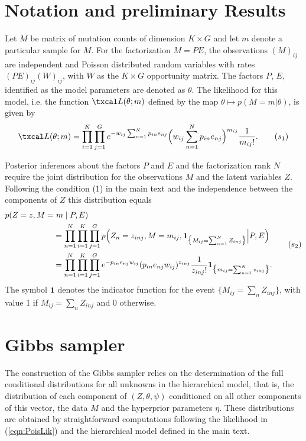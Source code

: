 \documentclass[11pt]{amsart}
\theoremstyle{definition}
\theoremstyle{remark}
\begin{document}
\tableofcontents 

\section{Notation and preliminary Results}
Let $M$ be matrix of mutation counts of dimension $K\times G$ and let
$m$ denote a particular sample for $M$. For the factorization $M=PE$,
the observations $(M)_{ij}$ are independent and Poisson distributed
random variables with rates $(PE)_{ij}(W)_{ij}$, with $W$ as the
$K\times G$ opportunity matrix. The factors $P$, $E$, identified as
the model parameters are denoted as $\theta$. The likelihood for this
model, i.e. the function $\txcal L(\theta; m)$ defined by the map
$\theta \mapsto p(M=m|\theta)$, is given by
\begin{equation}
  \label{eqn:PoisLik}
   \txcal L(\theta; m) 
   =
    \prod_{i=1}^K \prod_{j=1}^G e^{-w_{ij}\sum_{n=1}^{N}p_{in}e_{nj}}
    \Big(w_{ij}\sum_{n=1}^{N}p_{in}e_{nj}\Big)^{m_{ij}}
    \frac{1}{m_{ij}!}.\tag{$s_1$}
\end{equation}

Posterior inferences about the factors $P$ and $E$ and the
factorization rank $N$ require the joint distribution for the
observations $M$ and the latent variables $Z$. Following the condition (1) in the main text and the independence between
the components of $Z$ this distribution equals
\begin{equation}
   \label{eqn:jointdata}
 \begin{aligned}
    p(Z = z, M =&\ m \mid P, E) \notag\\
  &= 
    \prod_{n=1}^N\prod_{i=1}^K\prod_{j=1}^G p\Big(Z_n = z_{inj}, M =
    m_{ij}, \mathbf{1}_{\big\{M_{ij} = \sum_{n=1}^N
      Z_{inj}\big\}} \Big| P, E\Big)  \notag\\ 
  &=
    \prod_{n=1}^N\prod_{i=1}^K\prod_{j=1}^G e^{-p_{in}e_{nj}w_{ij}}
    (p_{in}e_{nj}w_{ij})^{z_{inj}} \frac{1}{z_{inj}!}
    \mathbf{1}_{\big\{m_{ij} = \sum_{n=1}^N z_{inj}\big\}}.
 \end{aligned}
 \tag{$s_2$}
\end{equation}
The symbol $\mathbf{1}$ denotes the indicator function for the 
event $\big\{M_{ij} = \sum_n Z_{inj}\big\}$, with value 1 if $M_{ij} =  
\sum_n  Z_{inj}$ and 0 otherwise.


\section{Gibbs sampler}
\label{sec:Gibbs}
The construction of the Gibbs sampler relies on the determination of
the full conditional distributions for all unknowns in the
hierarchical model, that is, the distribution of each component of
$(Z, \theta, \psi)$ conditioned on all other components of this vector,
the data $M$ and the hyperprior parameters $\eta$. These distributions
are obtained by straightforward computations following the likelihood
in (\ref{eqn:PoisLik}) and the hierarchical model defined in the main
text.
\end{document}
